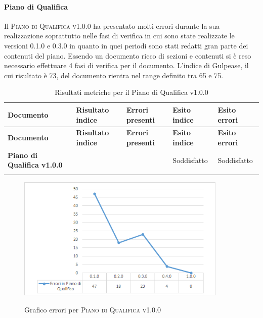 \documentclass[../piano-di-qualifica.tex]{subfiles}
\begin{document}
\paragraph{Piano di Qualifica}
\label{sub:piano_di_qualifica}
Il \textsc{Piano di Qualifica v1.0.0} ha presentato molti errori durante la sua realizzazione soprattutto nelle fasi di verifica in cui sono state realizzate le versioni 0.1.0 e 0.3.0 in quanto in quei periodi sono stati redatti gran parte dei contenuti del piano.
Essendo un documento ricco di sezioni e contenuti si è reso necessario effettuare 4 fasi di verifica per il documento.
L'indice di Gulpease, il cui risultato è 73, del documento rientra nel range definito tra 65 e 75.

\renewcommand{\arraystretch}{2} %
\begin{longtable}[H]{>{\centering\bfseries}m{6cm} >{\centering}m{2cm} >{\centering}m{2.5cm} >{\centering}m{2.5cm} >{\centering\arraybackslash}m{2.5cm}}  
  \rowcolor{lightgray}
  {\textbf{Documento}} & {\textbf{Risultato indice}} & {\textbf{Errori presenti}} & {\textbf{Esito indice}} & {\textbf{Esito errori}}  \\
  \endfirsthead%
  \rowcolor{lightgray}
  {\textbf{Documento}} & {\textbf{Risultato indice}} & {\textbf{Errori presenti}} & {\textbf{Esito indice}} & {\textbf{Esito errori}}  \\
  \endhead%
  \textbf{Piano di Qualifica v1.0.0} &  73               & 0               & Soddisfatto & Soddisfatto \\
  \caption{Risultati metriche per il Piano di Qualifica v1.0.0}
  \label{tab:my-table}
\end{longtable}

\begin{figure}[H]
    \centering
    \includegraphics[width=10cm]{img/erroriPdQ.png}
    \label{fig:scice_documenti}
    \caption{Grafico errori per \textsc{Piano di Qualifica v1.0.0}}
\end{figure}
\end{document}

